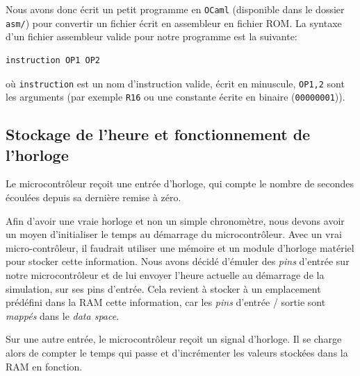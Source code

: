 \documentclass[11pt]{article}
\begin{document}
Nous avons donc écrit un petit programme en \texttt{OCaml} (disponible dans le dossier \texttt{asm/}) pour convertir un fichier écrit en assembleur en fichier ROM. La syntaxe d'un fichier assembleur valide pour notre programme est la suivante:
\begin{verbatim}
instruction OP1 OP2
\end{verbatim}
où \texttt{instruction} est un nom d'instruction valide, écrit en minuscule, \texttt{OP1,2} sont les arguments (par exemple \texttt{R16} ou une constante écrite en binaire (\texttt{00000001})).


\subsection{Stockage de l'heure et fonctionnement de l'horloge}

Le microcontrôleur reçoit une entrée d'horloge, qui compte le nombre de secondes écoulées depuis sa dernière remise à zéro.

Afin d'avoir une vraie horloge et non un simple chronomètre, nous devons avoir un moyen d'initialiser le temps au démarrage du microcontrôleur. Avec un vrai micro-contrôleur, il faudrait utiliser une mémoire et un module d'horloge matériel pour stocker cette information. Nous avons décidé d'émuler des \emph{pins} d'entrée sur notre microcontrôleur et de lui envoyer l'heure actuelle au démarrage de la simulation, sur ses pins d'entrée. Cela revient à stocker à un emplacement prédéfini dans la RAM cette information, car les \emph{pins} d'entrée / sortie sont \emph{mappés} dans le \emph{data space}.

Sur une autre entrée, le microcontrôleur reçoit un signal d'horloge. Il se charge alors de compter le temps qui passe et d'incrémenter les valeurs stockées dans la RAM en fonction.
\end{document}
